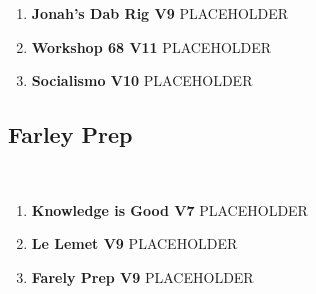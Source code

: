 \begin{enumerate}[resume]
	\item\label{rt:Jonah's Dab Rig} \colorbox{Goldenrod!50}{\textbf{Jonah's Dab Rig V9  } }
	\newline PLACEHOLDER\
	\item\label{rt:Workshop 68} \colorbox{red!20}{\textbf{Workshop 68 V11  } }
	\newline PLACEHOLDER\
	\item\label{rt:Socialismo} \colorbox{red!20}{\textbf{Socialismo V10  } }
	\newline PLACEHOLDER\
\end{enumerate}
\subsection*{Farley Prep}\label{bf:Farley Prep}
\

\begin{enumerate}[resume]
	\item\label{rt:Knowledge is Good} \colorbox{Goldenrod!50}{\textbf{Knowledge is Good V7  } }
	\newline PLACEHOLDER\
	\item\label{rt:Le Lemet} \colorbox{Goldenrod!50}{\textbf{Le Lemet V9  } }
	\newline PLACEHOLDER\
	\item\label{rt:Farely Prep} \colorbox{Goldenrod!50}{\textbf{Farely Prep V9  } }
	\newline PLACEHOLDER\
\end{enumerate}
\clearpage